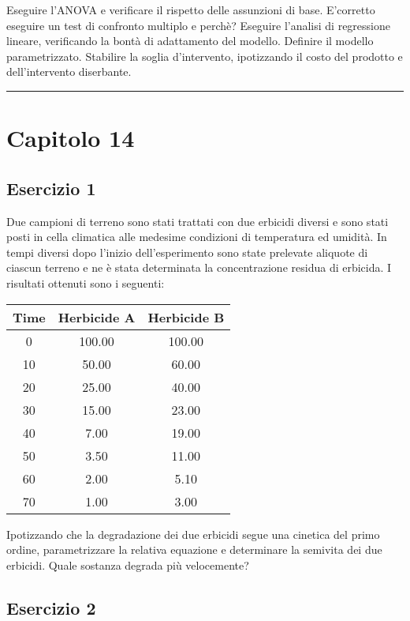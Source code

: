 \documentclass[a4paper,12pt,oneside]{book}
\begin{document}
Eseguire l'ANOVA e verificare il rispetto delle assunzioni di base. E'corretto eseguire un test di confronto multiplo e perchè? Eseguire l'analisi di regressione lineare, verificando la bontà di adattamento del modello. Definire il modello parametrizzato. Stabilire la soglia d'intervento, ipotizzando il costo del prodotto e dell'intervento diserbante.

\begin{center}\rule{0.5\linewidth}{0.5pt}\end{center}

\hypertarget{capitolo-14}{%
\section{Capitolo 14}\label{capitolo-14}}

\hypertarget{esercizio-1-9}{%
\subsection{Esercizio 1}\label{esercizio-1-9}}

Due campioni di terreno sono stati trattati con due erbicidi diversi e sono stati posti in cella climatica alle medesime condizioni di temperatura ed umidità. In tempi diversi dopo l'inizio dell'esperimento sono state prelevate aliquote di ciascun terreno e ne è stata determinata la concentrazione residua di erbicida. I risultati ottenuti sono i seguenti:

\begin{longtable}[]{@{}ccc@{}}
\toprule
Time & Herbicide A & Herbicide B \\
\midrule
\endhead
0 & 100.00 & 100.00 \\
10 & 50.00 & 60.00 \\
20 & 25.00 & 40.00 \\
30 & 15.00 & 23.00 \\
40 & 7.00 & 19.00 \\
50 & 3.50 & 11.00 \\
60 & 2.00 & 5.10 \\
70 & 1.00 & 3.00 \\
\bottomrule
\end{longtable}

Ipotizzando che la degradazione dei due erbicidi segue una cinetica del primo ordine, parametrizzare la relativa equazione e determinare la semivita dei due erbicidi. Quale sostanza degrada più velocemente?

\hypertarget{esercizio-2-8}{%
\subsection{Esercizio 2}\label{esercizio-2-8}}
\end{document}
